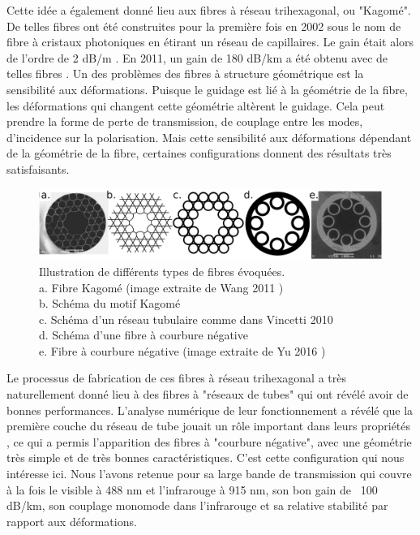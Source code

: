 Cette idée a également donné lieu aux fibres à réseau trihexagonal, ou "Kagomé". De telles fibres ont été construites pour la première fois en 2002 sous le nom de fibre à cristaux photoniques en étirant un réseau de capillaires. Le gain était alors de l'ordre de 2 dB/m \cite{benabid_stimulated_2002}. En 2011, un gain de 180 dB/km a été obtenu avec de telles fibres \cite{wang_low_2011}. Un des problèmes des fibres à structure géométrique est la sensibilité aux déformations. Puisque le guidage est lié à la géométrie de la fibre, les déformations qui changent cette géométrie altèrent le guidage. Cela peut prendre la forme de perte de transmission, de couplage entre les modes, d'incidence sur la polarisation. Mais cette sensibilité aux déformations dépendant de la géométrie de la fibre, certaines configurations donnent des résultats très satisfaisants.

\begin{figure}
\centering
\includegraphics[width=1\textwidth]{./files/fibers.svg.png}
\caption{Illustration de différents types de fibres évoquées.\\
a. Fibre Kagomé (image extraite de Wang 2011 \cite{wang_low_2011}) \\
b. Schéma du motif Kagomé\\
c. Schéma d'un réseau tubulaire comme dans Vincetti 2010 \cite{vincetti_waveguiding_2010}\\
d. Schéma d'une fibre à courbure négative\\
e. Fibre à courbure négative (image extraite de Yu 2016 \cite{yu_negative_2016})\\}
\end{figure}

Le processus de fabrication de ces fibres à réseau trihexagonal a très naturellement donné lieu à des fibres à "réseaux de tubes" qui ont révélé avoir de bonnes performances. L'analyse numérique de leur fonctionnement a révélé que la première couche du réseau de tube jouait un rôle important dans leurs propriétés \cite{vincetti_waveguiding_2010}, ce qui a permis l'apparition des fibres à "courbure négative", avec une géométrie très simple et de très bonnes caractéristiques. C'est cette configuration qui nous intéresse ici. Nous l'avons retenue pour sa large bande de transmission qui couvre à la fois le visible à 488 nm et l'infrarouge à 915 nm, son bon gain de ~100 dB/km, son couplage monomode dans l'infrarouge et sa relative stabilité par rapport aux déformations.

